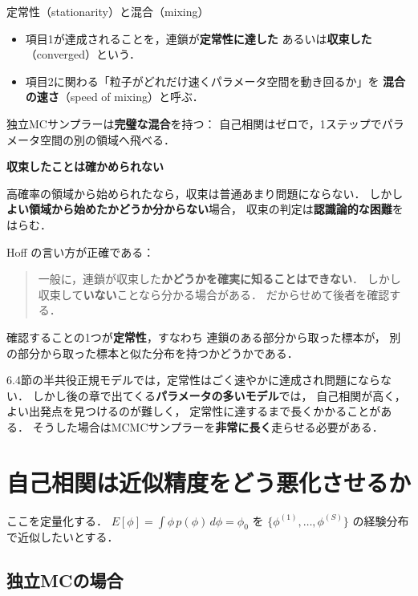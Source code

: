 \documentclass[lualatex,ja=standard,a4paper,12pt]{bxjsarticle}
\begin{document}
\begin{defbox}{定常性（stationarity）と混合（mixing）}
\begin{itemize}
  \item 項目1が達成されることを，連鎖が\textbf{定常性に達した}
        あるいは\textbf{収束した}（converged）という．
  \item 項目2に関わる「粒子がどれだけ速くパラメータ空間を動き回るか」を
        \textbf{混合の速さ}（speed of mixing）と呼ぶ．
\end{itemize}

\medskip
独立MCサンプラーは\textbf{完璧な混合}を持つ：
自己相関はゼロで，1ステップでパラメータ空間の別の領域へ飛べる．
\end{defbox}

\begin{warningbox}
\textbf{収束したことは確かめられない}

高確率の領域から始められたなら，収束は普通あまり問題にならない．
しかし\textbf{よい領域から始めたかどうか分からない}場合，
収束の判定は\textbf{認識論的な困難}をはらむ．

\medskip
Hoff の言い方が正確である：
\begin{quote}
一般に，連鎖が収束した\textbf{かどうかを確実に知ることはできない}．
しかし収束して\textbf{いない}ことなら分かる場合がある．
だからせめて後者を確認する．
\end{quote}

\medskip
確認することの1つが\textbf{定常性}，すなわち
連鎖のある部分から取った標本が，
別の部分から取った標本と似た分布を持つかどうかである．
\end{warningbox}

\medskip
\noindent 6.4節の半共役正規モデルでは，定常性はごく速やかに達成され問題にならない．
しかし後の章で出てくる\textbf{パラメータの多いモデル}では，
自己相関が高く，よい出発点を見つけるのが難しく，
定常性に達するまで長くかかることがある．
そうした場合はMCMCサンプラーを\textbf{非常に長く}走らせる必要がある．

\section{自己相関は近似精度をどう悪化させるか}

ここを定量化する．
$E[\phi] = \int \phi\, p(\phi)\, d\phi = \phi_0$ を
$\{\phi^{(1)}, \ldots, \phi^{(S)}\}$ の経験分布で近似したいとする．

\subsection*{独立MCの場合}
\end{document}
